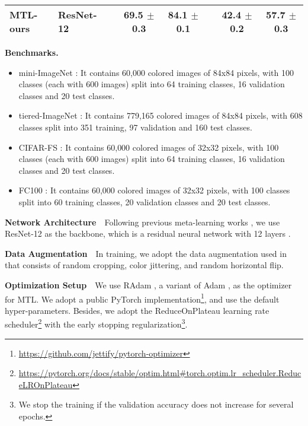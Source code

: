 \documentclass{article}
\begin{document}
\begin{table*}[ht!]
\begin{center}
{\begin{tabular}{@{}llc@{}cc@{}c@{}cc@{}}
    \midrule
    MTL-ours & ResNet-12 && 69.5 $\pm$ 0.3 &  \textbf{84.1 $\pm$ 0.1}  && \textbf{42.4 $\pm$ 0.2} &  \textbf{57.7 $\pm$ 0.3}\\
        
\bottomrule
    \hline
    \end{tabular}
    }
    \end{center}
\end{table*} \textbf{Benchmarks.}
\vspace{-.7em}
\begin{itemize}[leftmargin=*,align=left]
    \item mini-ImageNet \cite{matching-net}: It contains 60,000 colored images of 84x84 pixels, with 100 classes (each with 600 images) split into 64 training classes, 16 validation classes and 20 test classes.
    \item tiered-ImageNet \cite{ren2018metalearning}: It contains 779,165 colored images of 84x84 pixels, with 608 classes split into 351 training, 97 validation and 160 test classes.
    \item CIFAR-FS \cite{r2d2}: It contains 60,000 colored images of 32x32 pixels, with 100 classes (each with 600 images) split into 64 training classes, 16 validation classes and 20 test classes.
    \item FC100 \cite{NEURIPS2018_66808e32}: It contains 60,000 colored images of 32x32 pixels, with 100 classes split into 60 training classes, 20 validation classes and 20 test classes.
\end{itemize}

\textbf{Network Architecture}~~Following previous meta-learning works \cite{metaOptNet,NEURIPS2018_66808e32,tian2020rethink}, we use ResNet-12 as the backbone, which is a residual neural network with 12 layers \cite{resnet}. 

\textbf{Data Augmentation}~~In training, we adopt the data augmentation used in \citet{metaOptNet} that consists of random cropping, color jittering, and random horizontal flip.

\textbf{Optimization Setup}~~We use RAdam \cite{liu2019radam}, a variant of Adam \cite{adam}, as the optimizer for MTL. We adopt a public PyTorch implementation\footnote{ \url{https://github.com/jettify/pytorch-optimizer}}, and use the default hyper-parameters. Besides, we adopt the ReduceOnPlateau learning rate scheduler\footnote{ \url{https://pytorch.org/docs/stable/optim.html\#torch.optim.lr_scheduler.ReduceLROnPlateau}} with the early stopping regularization\footnote{We stop the training if the validation accuracy does not increase for several epochs.}.
\end{document}

